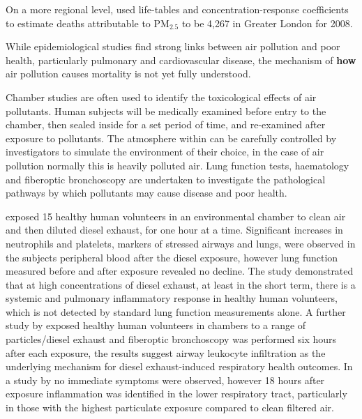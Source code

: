 On a more regional level, \cite{Miller2010} used life-tables and concentration-response coefficients to estimate deaths attributable to PM$_{2.5}$ to be 4,267 in Greater London for 2008.


While epidemiological studies find strong links between air pollution and poor health, particularly pulmonary and cardiovascular disease, the mechanism of \textbf{how} air pollution causes mortality is not yet fully understood. 


Chamber studies are often used to identify the toxicological effects of air pollutants. Human subjects will be medically examined before entry to the chamber, then sealed inside for a set period of time, and re-examined after exposure to pollutants. The atmosphere within can be carefully controlled by investigators to simulate the environment of their choice, in the case of air pollution normally this is heavily polluted air. Lung function tests, haematology and fiberoptic bronchoscopy are undertaken to investigate the pathological pathways by which pollutants may cause disease and poor health.

\cite{Salvi1999} exposed 15 healthy human volunteers in an environmental chamber to  clean air and then diluted diesel exhaust, for one hour at a time. Significant increases in neutrophils and platelets, markers of stressed airways and lungs, were observed in the subjects peripheral blood after the diesel exposure, however lung function measured before and after exposure revealed no decline. The study demonstrated that at high concentrations of diesel exhaust, at least in the short term, there is a systemic and pulmonary inflammatory response in healthy human volunteers, which is not detected by standard lung function measurements alone. A further study by \cite{Salvi2000} exposed healthy human volunteers in chambers to a range of particles/diesel exhaust and fiberoptic bronchoscopy was performed six hours after each exposure, the results suggest airway leukocyte infiltration as the underlying mechanism for diesel exhaust-induced respiratory health outcomes. In a study by \cite{Ghio2000} no immediate symptoms were observed, however 18 hours after exposure inflammation was identified in the lower respiratory tract, particularly in those with the highest particulate exposure compared to clean filtered air.

